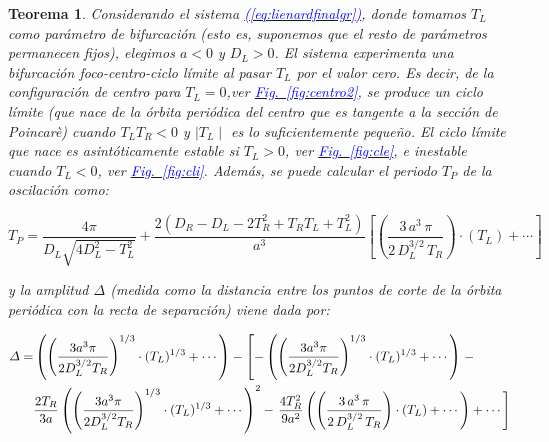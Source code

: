 \documentclass[12pt,a4paper]{report} %
\newtheorem{theorem}{Teorema}[chapter]
\newcommand{\fref}[1]{\hyperref[#1]{\textcolor{blue}{Fig.~\ref*{#1}}}}
\newcommand{\eref}[1]{\hyperref[#1]{\textcolor{blue}{(\ref*{#1})}}}
\begin{document}
	\begin{theorem}
		\label{teo:5.1}
		Considerando el sistema \eref{eq:lienardfinalgr}, donde tomamos $T_L$ como parámetro de bifurcación (esto es, suponemos que el resto de parámetros permanecen fijos), elegimos $a<0$ y $D_L>0$. El sistema experimenta una bifurcación foco-centro-ciclo límite al pasar $T_L$ por el valor cero. Es decir, de la configuración de centro para $T_L=0$,ver \fref{fig:centro2}, se produce un ciclo límite (que nace de la órbita periódica del centro que es tangente a la sección de Poincarè) cuando $T_L T_R<0$ y $\mid T_L \mid$ es lo suficientemente pequeño. El ciclo límite que nace es asintóticamente estable si $T_L>0$, ver \fref{fig:cle}, e inestable cuando $T_L<0$, ver \fref{fig:cli}. Además, se puede calcular el periodo $T_P$ de la oscilación como:
		
		\begin{equation}
			\label{eq:tperiodo}
			T_P= \frac{4\pi}{D_L\sqrt{4D_L^2-T_L^2}}+\frac{2(D_R-D_L-2T_R^2+T_RT_L+T_L^2)}{a^3}\left[\left( \frac{3\, a^3 \, \pi}{2\, D_L^{3/2}\, T_R} \right)\cdot \left(T_L\right)+\cdots\right]
		\end{equation}\smallskip
		
		\noindent y la amplitud $\varDelta$ (medida como la distancia entre los puntos de corte de la órbita periódica con la recta de separación) viene dada por:
		
		\begin{equation}
			\label{eq:amplitu}
			\scalebox{0.95}{$\displaystyle
				\begin{split}
					\varDelta = &\left( \left( \frac{3a^3 \pi}{2D_L^{3/2}T_R} \right)^{1/3} \cdot (T_L)^{1/3} + \cdots \right) - \left[ -\left( \left( \frac{3a^3 \pi}{2D_L^{3/2}T_R} \right)^{1/3} \cdot (T_L)^{1/3} + \cdots \right) \right.-\\
					&\frac{2T_R}{3a} \left( \left( \frac{3a^3 \pi}{2D_L^{3/2}T_R} \right)^{1/3} \cdot (T_L)^{1/3} + \cdots \right)^2 - \left. \frac{4T_R^2}{9a^2} \left( \left( \frac{3\, a^3 \, \pi}{2\, D_L^{3/2}\, T_R} \right)\cdot \left(T_L\right)+\cdots \right) + \cdots \right]
				\end{split}
				$}
		\end{equation}
	\end{theorem}
	
	\newpage
	
\end{document}
